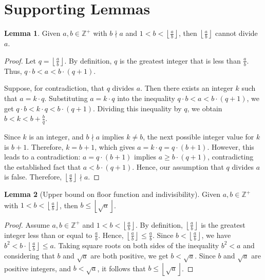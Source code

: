 \documentclass{article}
\theoremstyle{plain}
\theoremstyle{definition}
\newtheorem{lemma}{Lemma}
\newcommand{\Z}{\mathbb{Z}}
\begin{document}
\section{Supporting Lemmas}
\begin{lemma} \label{lemma:floornondivisor}
Given $a,b \in \Z^{+}$ with \(b \nmid a\) and \( 1 < b < \left\lfloor \frac{a}{b} \right\rfloor \), then \(\left\lfloor \frac{a}{b} \right\rfloor \) cannot divide \(a\).
\end{lemma}
\begin{proof}
Let \(q = \left\lfloor \frac{a}{b} \right\rfloor\). By definition, \(q\) is the greatest integer that is less than \(\frac{a}{b}\). Thus, \(q \cdot b < a < b \cdot (q + 1)\).

Suppose, for contradiction, that \(q\) divides \(a\). Then there exists an integer \(k\) such that \(a = k \cdot q\). Substituting \(a = k \cdot q\) into the inequality \(q \cdot b < a < b \cdot (q + 1) \), we get \(q \cdot b < k \cdot q < b \cdot (q + 1) \). Dividing this inequality by \(q\), we obtain \(b < k < b + \frac{b}{q}\).

Since \(k\) is an integer, and \(b \nmid a\) implies \(k \neq b\), the next possible integer value for \(k\) is \(b + 1\). Therefore, \(k = b + 1\), which gives \(a = k \cdot q = q \cdot (b + 1)\). However, this leads to a contradiction: \(a = q \cdot (b + 1) \) implies \(a \geq b \cdot (q + 1) \), contradicting the established fact that \(a < b \cdot (q + 1) \). Hence, our assumption that \(q\) divides \(a\) is false. Therefore, \(\left\lfloor \frac{a}{b} \right\rfloor \nmid a\).
\end{proof}

\begin{lemma}[Upper bound on floor function and indivisibility]
\label{lemma:floornondivisorupperbound}
Given $a,b \in \Z^{+}$ with \( 1 < b < \left\lfloor \frac{a}{b} \right\rfloor \), then \(b \leq \left\lfloor \sqrt{a} \right\rfloor\).
\end{lemma}
\begin{proof}
Assume \( a, b \in \Z^{+} \) and \( 1 < b < \left\lfloor \frac{a}{b} \right\rfloor \). By definition, \( \left\lfloor \frac{a}{b} \right\rfloor \) is the greatest integer less than or equal to \( \frac{a}{b} \). Hence, \( \left\lfloor \frac{a}{b} \right\rfloor \leq \frac{a}{b} \). Since \( b < \left\lfloor \frac{a}{b} \right\rfloor \), we have \( b^2 < b \cdot \left\lfloor \frac{a}{b} \right\rfloor \leq a \). Taking square roots on both sides of the inequality \( b^2 < a \) and considering that \( b \) and \( \sqrt{a} \) are both positive, we get \( b < \sqrt{a} \). Since \( b \) and \( \sqrt{a} \) are positive integers, and \( b < \sqrt{a} \), it follows that \( b \leq \left\lfloor \sqrt{a} \right\rfloor \).
\end{proof}
\end{document}
